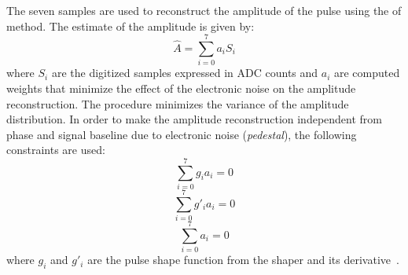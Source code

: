 The seven samples are used to reconstruct the amplitude of the pulse using the
\gls{of} method. The estimate of the amplitude is given by:
\begin{equation}
  \label{eq:66}
  \hat{A} = \sum_{i = 0}^7 a_i S_i
\end{equation}
where $S_i$ are the digitized samples expressed in ADC counts and $a_i$ are
computed weights that minimize the effect of the electronic noise on the
amplitude reconstruction. The procedure minimizes the variance of the amplitude
distribution. In order to make the amplitude reconstruction independent from
phase and signal baseline due to electronic noise (\emph{pedestal}), the
following constraints are used:
\begin{equation}
  \label{eq:67}
  \sum_{i = 0}^7 g_i a_i = 0
\end{equation}
\begin{equation}
  \label{eq:68}
  \sum_{i = 0}^7 g'_i a_i = 0
\end{equation}
\begin{equation}
  \label{eq:69}
  \sum_{i = 0}^7 a_i = 0
\end{equation}
where $g_i$ and $g'_i$ are the pulse shape function from the shaper and its
derivative~\cite{OptimalFilter}.
